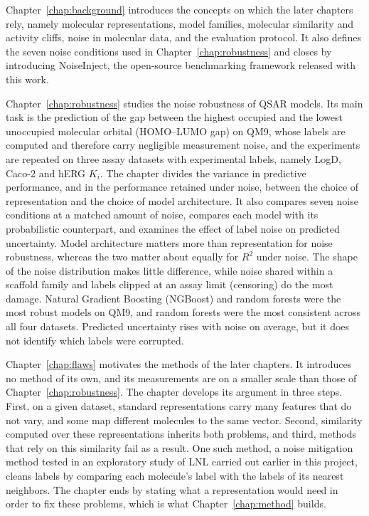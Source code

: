 Chapter~\ref{chap:background} introduces the concepts on which the later chapters rely, namely molecular representations, model families, molecular similarity and activity cliffs, noise in molecular data, and the evaluation protocol. It also defines the seven noise conditions used in Chapter~\ref{chap:robustness} and closes by introducing NoiseInject, the open-source benchmarking framework released with this work.

Chapter~\ref{chap:robustness} studies the noise robustness of QSAR models. Its main task is the prediction of the gap between the highest occupied and the lowest unoccupied molecular orbital (HOMO--LUMO gap) on QM9, whose labels are computed and therefore carry negligible measurement noise, and the experiments are repeated on three assay datasets with experimental labels, namely LogD, Caco-2 and hERG $K_i$. The chapter divides the variance in predictive performance, and in the performance retained under noise, between the choice of representation and the choice of model architecture. It also compares seven noise conditions at a matched amount of noise, compares each model with its probabilistic counterpart, and examines the effect of label noise on predicted uncertainty. Model architecture matters more than representation for noise robustness, whereas the two matter about equally for $R^2$ under noise. The shape of the noise distribution makes little difference, while noise shared within a scaffold family and labels clipped at an assay limit (censoring) do the most damage. Natural Gradient Boosting (NGBoost) and random forests were the most robust models on QM9, and random forests were the most consistent across all four datasets. Predicted uncertainty rises with noise on average, but it does not identify which labels were corrupted.

Chapter~\ref{chap:flaws} motivates the methods of the later chapters. It introduces no method of its own, and its measurements are on a smaller scale than those of Chapter~\ref{chap:robustness}. The chapter develops its argument in three steps. First, on a given dataset, standard representations carry many features that do not vary, and some map different molecules to the same vector. Second, similarity computed over these representations inherits both problems, and third, methods that rely on this similarity fail as a result. One such method, a noise mitigation method tested in an exploratory study of LNL carried out earlier in this project, cleans labels by comparing each molecule's label with the labels of its nearest neighbors. The chapter ends by stating what a representation would need in order to fix these problems, which is what Chapter~\ref{chap:method} builds.

